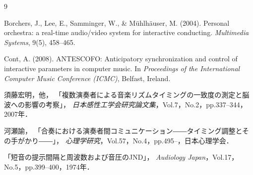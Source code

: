 \documentclass[lualatex,book,paper=a4paper,jafontsize=11.5pt,jafontscale=1.05,oneside]{jlreq}
\begin{document}
\begin{thebibliography}{9}

  Borchers, J., Lee, E., Samminger, W., \& M{\"u}hlh{\"a}user, M. (2004).
  Personal orchestra: a real-time audio/video system for interactive conducting.
  \textit{Multimedia Systems}, 9(5), 458--465.

  Cont, A. (2008).
  ANTESCOFO: Anticipatory synchronization and control of interactive parameters in computer music.
  In \textit{Proceedings of the International Computer Music Conference (ICMC)}, Belfast, Ireland.

  須藤宏明，他，
  「複数演奏者による音楽リズムタイミングの一致度の測定と脳波への影響の考察」，
  \textit{日本感性工学会研究論文集}，Vol.7，No.2，pp.337--344，2007年．

  河瀬諭，
  「合奏における演奏者間コミュニケーション――タイミング調整とその手がかり――」，
  \textit{心理学研究}，Vol.57，No.4，pp.495--，日本心理学会．

  「短音の提示間隔と周波数および音圧のJND」，
  \textit{Audiology Japan}，Vol.17，No.5，pp.399--400，1974年．

\end{thebibliography}
\end{document}

